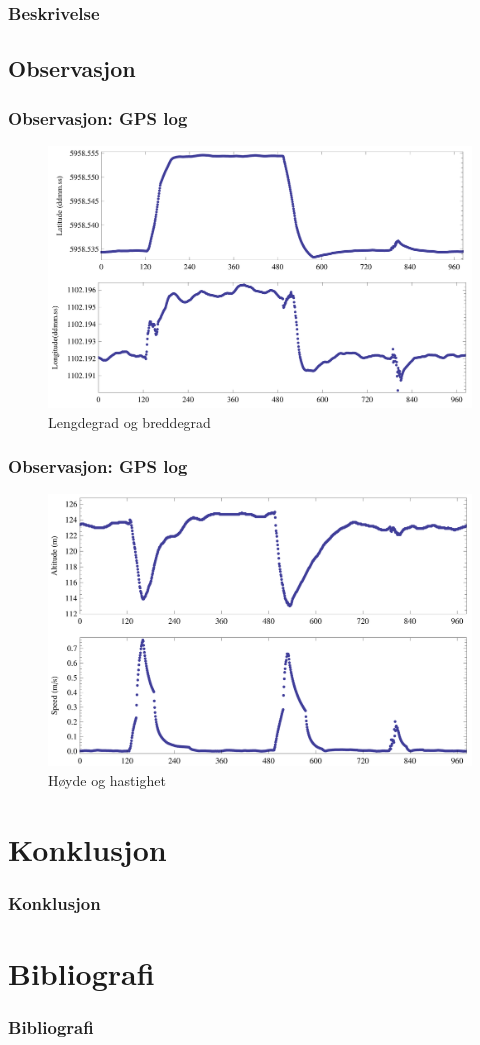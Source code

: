 \documentclass[xcolor=table]{beamer}
\begin{document}
\begin{frame}
\frametitle{Beskrivelse}
\end{frame}

\begin{frame}
\subsection{Observasjon}
\frametitle{Observasjon: GPS log}
        \begin{figure}
        \includegraphics[scale=0.8]{thesis/graphics/20161024-test2-sensor2-multipanel-1-1.png}
        \caption{Lengdegrad og breddegrad}
      \end{figure}
\end{frame}

\begin{frame}
\frametitle{Observasjon: GPS log}
        \begin{figure}
        \includegraphics[scale=0.8]{thesis/graphics/20161024-test2-sensor2-multipanel-1-2.png}
        \caption{Høyde og hastighet}
      \end{figure}
\end{frame}

\section{Konklusjon}
\begin{frame}
  \frametitle{Konklusjon}
\end{frame}

\section{Bibliografi}
\begin{frame}[allowframebreaks]%
  \frametitle{Bibliografi}
  \printbibliography[heading=bibintoc]
\end{frame}
\end{document}
